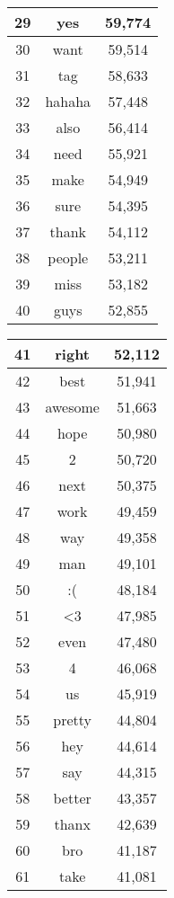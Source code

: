 \begin{table}[!htbp]
\begin{minipage}[b]{.5\textwidth}
\begin{tabular}{|c|c|c|}
		29 & yes & 59,774 \\ \hline
		30 & want & 59,514 \\ \hline
		31 & tag & 58,633 \\ \hline
		32 & hahaha & 57,448 \\ \hline
		33 & also & 56,414 \\ \hline
		34 & need & 55,921 \\ \hline
		35 & make & 54,949 \\ \hline
		36 & sure & 54,395 \\ \hline
		37 & thank & 54,112 \\ \hline
		38 & people & 53,211 \\ \hline
		39 & miss & 53,182 \\ \hline
		40 & guys & 52,855 \\ \hline
		\end{tabular}
\end{minipage}
\begin{minipage}[b]{.5\textwidth}
\centering
\begin{tabular}{|c|c|c|} %
		\hline
		41 & right & 52,112 \\ \hline
		42 & best & 51,941 \\ \hline
		43 & awesome & 51,663 \\ \hline
		44 & hope & 50,980 \\ \hline
		45 & 2 & 50,720 \\ \hline
		46 & next & 50,375 \\ \hline
		47 & work & 49,459 \\ \hline
		48 & way & 49,358 \\ \hline
		49 & man & 49,101 \\ \hline
		50 & :( & 48,184 \\ \hline
		51 & <3 & 47,985 \\ \hline
		52 & even & 47,480 \\ \hline
		53 & 4 & 46,068 \\ \hline
		54 & us & 45,919 \\ \hline
		55 & pretty & 44,804 \\ \hline
		56 & hey & 44,614 \\ \hline
		57 & say & 44,315 \\ \hline
		58 & better & 43,357 \\ \hline
		59 & thanx & 42,639 \\ \hline
		60 & bro & 41,187 \\ \hline
		61 & take & 41,081 \\ \hline

\end{tabular}
\end{minipage}
\end{table}
